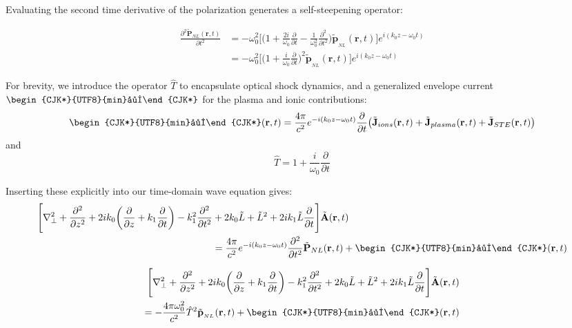 \documentclass[11pt,a4paper]{article}
\newcommand{\gawa}{\text{\begin{CJK*}{UTF8}{min}川\end{CJK*}}}
\begin{document}
Evaluating the second time derivative of the polarization generates a self-steepening operator: 

\begin{equation*}
\begin{split}
\frac{\partial^2\tilde{\mathbf{P}}_{NL}(\mathbf{r},t)}{\partial t^2} &= -\omega_0^2\Bigg[\big(1+\frac{2i}{\omega_0}\frac{\partial}{\partial t} -\frac{1}{\omega_0^2}\frac{\partial^2}{\partial t^2}\big)\tilde{\mathbf{p}}_{_{NL}}(\mathbf{r},t) \Bigg]e^{i(k_0z-\omega_0t)} \\
&= -\omega_0^2\Bigg[\bigg(1+\frac{i}{\omega_0}\frac{\partial}{\partial t}\bigg)^2\tilde{\mathbf{p}}_{_{NL}}(\mathbf{r},t)\Bigg]e^{i(k_0z-\omega_0t)}
\end{split}
\end{equation*}

For brevity, we introduce the operator $\hat{T}$ to encapsulate optical shock dynamics, and a generalized envelope current $\gawa$ for the plasma and ionic contributions: 
\begin{equation*}
\gawa(\mathbf{r},t) = \frac{4\pi}{c^2}e^{-i(k_0z-\omega_0t)}\frac{\partial}{\partial t}\big(\tilde{\mathbf{J}}_{ions}(\mathbf{r},t)+\tilde{\mathbf{J}}_{plasma}(\mathbf{r},t)+\tilde{\mathbf{J}}_{STE}(\mathbf{r},t)\big)
\end{equation*}
and
\begin{equation*}
\hat{T}=1+\frac{i}{\omega_0}\frac{\partial}{\partial t} 
\end{equation*}

Inserting these explicitly into our time-domain wave equation gives:
\begin{equation*}
\begin{split}
\Bigg[\nabla_\perp^2 + \frac{\partial^2 }{\partial z^2} + 2ik_0 \bigg(\frac{\partial}{\partial z}+k_1\frac{\partial}{\partial t}\bigg) -  k_1^2\frac{\partial^2}{\partial t^2}  &+ 2k_0\tilde{L}+\tilde{L}^2 + 2ik_1\tilde{L}\frac{\partial}{\partial t}\Bigg] \tilde{\mathbf{A}}(\mathbf{r},t) \\
&= \frac{4\pi}{c^2}e^{-i(k_0z-\omega_0t)}\frac{\partial^2}{\partial t ^2}\tilde{\mathbf{P}}_{NL}(\mathbf{r},t)+\gawa (\mathbf{r},t)
\end{split}
\end{equation*}

\begin{equation*}
\begin{split}
\Bigg[\nabla_\perp^2 + \frac{\partial^2 }{\partial z^2} + 2ik_0 \bigg(\frac{\partial}{\partial z}+k_1\frac{\partial}{\partial t}\bigg) -  k_1^2\frac{\partial^2}{\partial t^2}  + 2k_0\tilde{L}+\tilde{L}^2 + 2ik_1\tilde{L}\frac{\partial}{\partial t}\Bigg] \tilde{\mathbf{A}}(\mathbf{r},t) \\
= -\frac{4\pi\omega_0^2}{c^2}\hat{T}^2\tilde{\mathbf{p}}_{_{NL}}(\mathbf{r},t)+\gawa(\mathbf{r},t)
\end{split}
\end{equation*}
\end{document}
